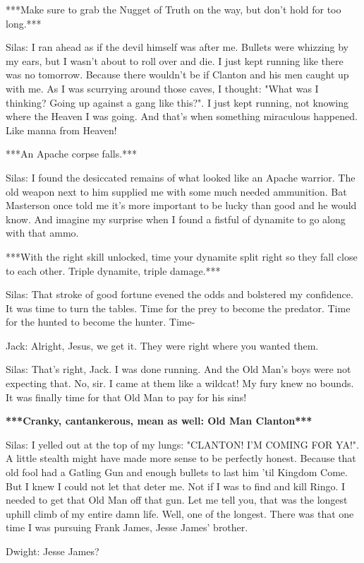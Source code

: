 \documentclass{article}
\begin{document}
***Make sure to grab the Nugget of Truth on the way, but don't hold for too long.***

Silas: I ran ahead as if the devil himself was after me. Bullets were whizzing by my ears, but I wasn't about to roll over and die. I just kept running like there was no tomorrow. Because there wouldn't be if Clanton and his men caught up with me. As I was scurrying around those caves, I thought: "What was I thinking? Going up against a gang like this?". I just kept running, not knowing where the Heaven I was going. And that's when something miraculous happened. Like manna from Heaven!

***An Apache corpse falls.***

Silas: I found the desiccated remains of what looked like an Apache warrior. The old weapon next to him supplied me with some much needed ammunition. Bat Masterson once told me it's more important to be lucky than good and he would know. And imagine my surprise when I found a fistful of dynamite to go along with that ammo.

***With the right skill unlocked, time your dynamite split right so they fall close to each other. Triple dynamite, triple damage.***

Silas: That stroke of good fortune evened the odds and bolstered my confidence. It was time to turn the tables. Time for the prey to become the predator. Time for the hunted to become the hunter. Time-

Jack: Alright, Jesus, we get it. They were right where you wanted them.

Silas: That's right, Jack. I was done running. And the Old Man's boys were not expecting that. No, sir. I came at them like a wildcat! My fury knew no bounds. It was finally time for that Old Man to pay for his sins!

\textbf{***Cranky, cantankerous, mean as well: Old Man Clanton***}

Silas: I yelled out at the top of my lungs: "CLANTON! I'M COMING FOR YA!". A little stealth might have made more sense to be perfectly honest. Because that old fool had a Gatling Gun and enough bullets to last him 'til Kingdom Come. But I knew I could not let that deter me. Not if I was to find and kill Ringo. I needed to get that Old Man off that gun. Let me tell you, that was the longest uphill climb of my entire damn life. Well, one of the longest. There was that one time I was pursuing Frank James, Jesse James' brother.

Dwight: Jesse James?
\end{document}
